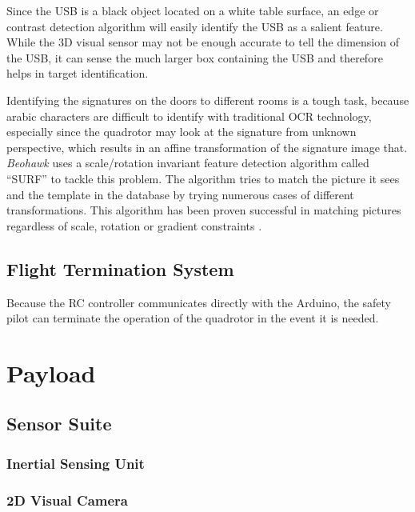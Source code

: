\documentclass[12pt, letterpaper]{article}
\begin{document}
Since the USB is a black object located on a white table surface, an edge or contrast detection algorithm will easily identify the USB as a salient feature. While the 3D visual sensor may not be enough accurate to tell the dimension of the USB, it can sense the much larger box containing the USB and therefore helps in target identification. 

Identifying the signatures on the doors to different rooms is a tough task, because arabic characters are difficult to identify with traditional OCR technology, especially since the quadrotor may look at the signature from unknown perspective, which results in an affine transformation of the signature image that. \textit{Beohawk} uses a scale/rotation invariant feature detection algorithm called ``SURF'' to tackle this problem. The algorithm tries to match the picture it sees and the template in the database by trying numerous cases of different transformations. This algorithm has been proven successful in matching pictures regardless of scale, rotation or gradient constraints .


\subsection{Flight Termination System}
Because the RC controller communicates directly with the Arduino, the safety pilot can terminate the operation of the quadrotor in the event it is needed.


\section{Payload}
\subsection{Sensor Suite}

\subsubsection{Inertial Sensing Unit}


\subsubsection{2D Visual Camera}
\end{document}
